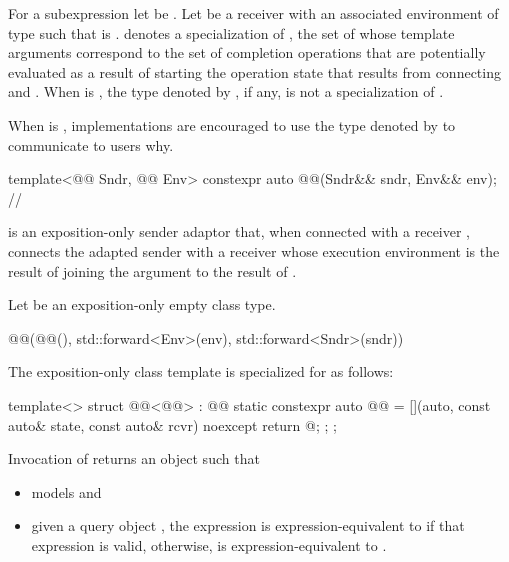 \pnum
For a subexpression  let  be .
Let  be a receiver
with an associated environment of type 
such that  is .
 denotes
a specialization of ,
the set of whose template arguments correspond to
the set of completion operations that are potentially evaluated
as a result of starting
the operation state that results from connecting  and .
When  is ,
the type denoted by ,
if any, is not a specialization of .

\recommended
When  is ,
implementations are encouraged to use the type
denoted by 
to communicate to users why.

\begin{itemdecl}
template<@@ Sndr, @@ Env>
  constexpr auto @@(Sndr&& sndr, Env&& env);     // \expos
\end{itemdecl}

\begin{itemdescr}
\pnum
{} is an exposition-only sender adaptor that,
when connected with a receiver ,
connects the adapted sender with a receiver
whose execution environment is the result of
joining the  argument 
to the result of .

\pnum
Let  be an exposition-only empty class type.

\pnum
\returns
\begin{codeblock}
@@(@@(), std::forward<Env>(env), std::forward<Sndr>(sndr))
\end{codeblock}

\pnum
\remarks
The exposition-only class template 
is specialized for  as follows:
\begin{codeblock}
template<>
struct @@<@@> : @@ {
  static constexpr auto @@ =
    [](auto, const auto& state, const auto& rcvr) noexcept {
      return @\seebelow@;
    };
};
\end{codeblock}
Invocation of
returns an object  such that
\begin{itemize}
\item
{} models  and
\item
given a query object ,
the expression  is expression-equivalent
to  if that expression is valid,
otherwise,  is expression-equivalent
to .
\end{itemize}
\end{itemdescr}

